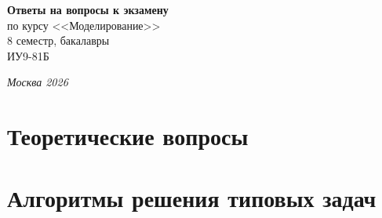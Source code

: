 \documentclass[a4paper,12pt]{extarticle}
\begin{document}
\begin{titlepage}
\thispagestyle{empty}
\vspace*{4cm}
\begin{center}
    {\Large\bfseries Ответы на вопросы к экзамену}\\[0.8em]
    {\large по курсу <<Моделирование>>}\\[0.4em]
    {\normalsize 8 семестр, бакалавры}\\[0.4em]
    {\normalsize ИУ9-81Б}
\end{center}
\vfill
\begin{center}
    \textsl{Москва 2026}
\end{center}
\end{titlepage}

\tableofcontents
\clearpage

{}
\part*{Теоретические вопросы}










































\clearpage
{}
{}
\part*{Алгоритмы решения типовых задач}









\end{document}
